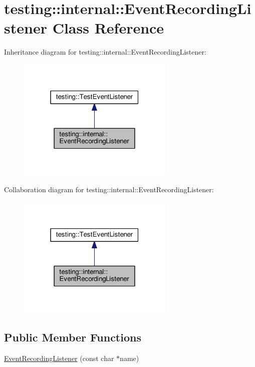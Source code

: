\hypertarget{classtesting_1_1internal_1_1EventRecordingListener}{}\section{testing\+:\+:internal\+:\+:Event\+Recording\+Listener Class Reference}
\label{classtesting_1_1internal_1_1EventRecordingListener}


Inheritance diagram for testing\+:\+:internal\+:\+:Event\+Recording\+Listener\+:\nopagebreak
\begin{figure}[H]
\begin{center}
\leavevmode
\includegraphics[width=211pt]{classtesting_1_1internal_1_1EventRecordingListener__inherit__graph}
\end{center}
\end{figure}


Collaboration diagram for testing\+:\+:internal\+:\+:Event\+Recording\+Listener\+:\nopagebreak
\begin{figure}[H]
\begin{center}
\leavevmode
\includegraphics[width=211pt]{classtesting_1_1internal_1_1EventRecordingListener__coll__graph}
\end{center}
\end{figure}
\subsection*{Public Member Functions}
\begin{DoxyCompactItemize}
\item 
\hyperlink{classtesting_1_1internal_1_1EventRecordingListener_a7b0254c15d6b8468e1441ee572fee707}{Event\+Recording\+Listener} (const char $\ast$name)
\end{DoxyCompactItemize}
